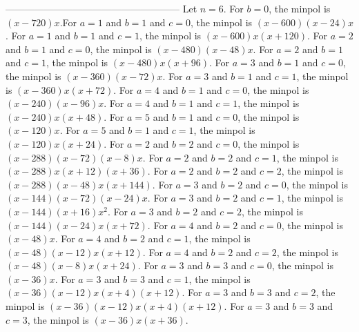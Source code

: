 \documentclass[numbers=enddot,12pt,final,onecolumn,notitlepage]{scrartcl}%
\numberwithin{exer}{subsection}
\theoremstyle{definition}
\begin{document}
------------------------------------------------------ \newline Let $n=6$.
\newline For $b=0$, the minpol is $(x-720)x$.\newline For $a=1$ and $b=1$ and
$c=0$, the minpol is $(x-600)(x-24)x$. \newline For $a=1$ and $b=1$ and $c=1$,
the minpol is $(x-600)x(x+120)$. \newline For $a=2$ and $b=1$ and $c=0$, the
minpol is $(x-480)(x-48)x$. \newline For $a=2$ and $b=1$ and $c=1$, the minpol
is $(x-480)x(x+96)$. \newline For $a=3$ and $b=1$ and $c=0$, the minpol is
$(x-360)(x-72)x$. \newline For $a=3$ and $b=1$ and $c=1$, the minpol is
$(x-360)x(x+72)$. \newline For $a=4$ and $b=1$ and $c=0$, the minpol is
$(x-240)(x-96)x$. \newline For $a=4$ and $b=1$ and $c=1$, the minpol is
$(x-240)x(x+48)$. \newline For $a=5$ and $b=1$ and $c=0$, the minpol is
$(x-120)x$. \newline For $a=5$ and $b=1$ and $c=1$, the minpol is
$(x-120)x(x+24)$. \newline For $a=2$ and $b=2$ and $c=0$, the minpol is
$(x-288)(x-72)(x-8)x$. \newline For $a=2$ and $b=2$ and $c=1$, the minpol is
$(x-288)x(x+12)(x+36)$. \newline For $a=2$ and $b=2$ and $c=2$, the minpol is
$(x-288)(x-48)x(x+144)$. \newline For $a=3$ and $b=2$ and $c=0$, the minpol is
$(x-144)(x-72)(x-24)x$. \newline For $a=3$ and $b=2$ and $c=1$, the minpol is
$(x-144)(x+16)x^{2}$. \newline For $a=3$ and $b=2$ and $c=2$, the minpol is
$(x-144)(x-24)x(x+72)$. \newline For $a=4$ and $b=2$ and $c=0$, the minpol is
$(x-48)x$. \newline For $a=4$ and $b=2$ and $c=1$, the minpol is
$(x-48)(x-12)x(x+12)$. \newline For $a=4$ and $b=2$ and $c=2$, the minpol is
$(x-48)(x-8)x(x+24)$. \newline For $a=3$ and $b=3$ and $c=0$, the minpol is
$(x-36)x$. \newline For $a=3$ and $b=3$ and $c=1$, the minpol is
$(x-36)(x-12)x(x+4)(x+12)$. \newline For $a=3$ and $b=3$ and $c=2$, the minpol
is $(x-36)(x-12)x(x+4)(x+12)$. \newline For $a=3$ and $b=3$ and $c=3$, the
minpol is $(x-36)x(x+36)$. \newline
\end{document}
